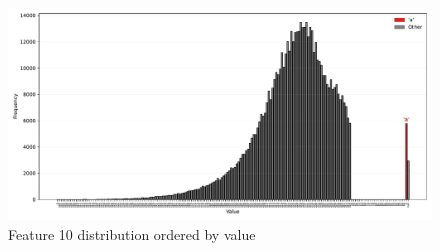 \documentclass[11pt]{article}
\begin{document}
\begin{figure}
		\begin{minipage}[t]{\textwidth}
		\centering
		\includegraphics[width=\textwidth]{images/10_distribution.pdf}
		\caption{Feature 10 distribution ordered by value}
		\label{fig:f10}
	\end{minipage}
\end{figure}




%
%
\end{document}
